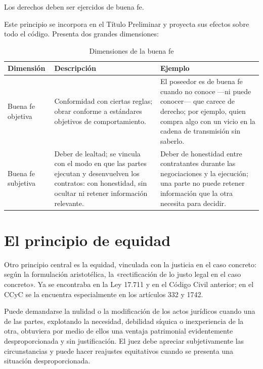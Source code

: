 \documentclass[12pt,oneside]{book}
\begin{document}
\begin{regla}
Los derechos deben ser ejercidos de buena fe.
\end{regla}

Este principio se incorpora en el Título Preliminar y proyecta sus efectos sobre todo el código. Presenta dos grandes dimensiones:

\begin{table}[H]
\centering
\begin{tabularx}{\textwidth}{B{0.17\textwidth} Y Y}
\toprule
\textbf{Dimensión} & \textbf{Descripción} & \textbf{Ejemplo} \\
\midrule
Buena fe objetiva & Conformidad con ciertas reglas; obrar conforme a estándares objetivos de comportamiento. & El poseedor es de buena fe cuando no conoce ---ni puede conocer--- que carece de derecho; por ejemplo, quien compra algo con un vicio en la cadena de transmisión sin saberlo. \\
Buena fe subjetiva & Deber de lealtad; se vincula con el modo en que las partes ejecutan y desenvuelven los contratos: con honestidad, sin ocultar ni retener información relevante. & Deber de honestidad entre contratantes durante las negociaciones y la ejecución; una parte no puede retener información que la otra necesita para decidir. \\
\bottomrule
\end{tabularx}
\caption{Dimensiones de la buena fe}
\end{table}

\section{El principio de equidad}

Otro principio central es la equidad, vinculada con la justicia en el caso concreto: según la formulación aristotélica, la «rectificación de lo justo legal en el caso concreto». Ya se encontraba en la Ley 17.711 y en el Código Civil anterior; en el CCyC se la encuentra especialmente en los artículos 332 y 1742.

\begin{regla}
Puede demandarse la nulidad o la modificación de los actos jurídicos cuando una de las partes, explotando la necesidad, debilidad síquica o inexperiencia de la otra, obtuviera por medio de ellos una ventaja patrimonial evidentemente desproporcionada y sin justificación. El juez debe apreciar subjetivamente las circunstancias y puede hacer reajustes equitativos cuando se presenta una situación desproporcionada.
\end{regla}
\end{document}
